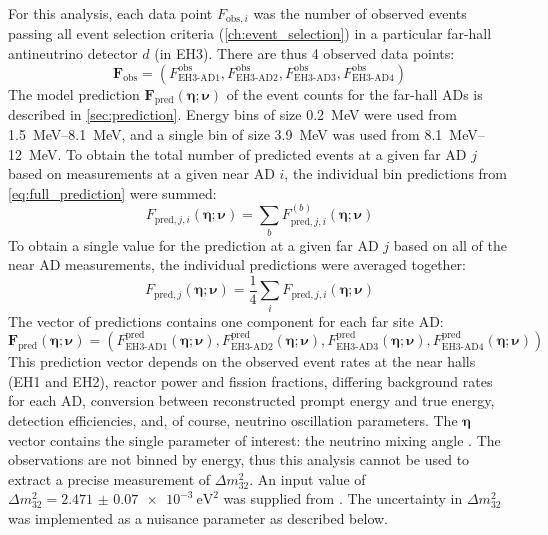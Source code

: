 For this analysis, each data point $F_{\text{obs},i}$
was the number of observed events passing all event selection criteria
(\cref{ch:event_selection})
in a particular far-hall antineutrino detector $d$ (in EH3).
There are thus 4 observed data points:
\begin{equation}
    \mathbf{F}_{\text{obs}} =
    (F^{\text{obs}}_{\text{EH3-AD1}},
    F^{\text{obs}}_{\text{EH3-AD2}},
    F^{\text{obs}}_{\text{EH3-AD3}},
    F^{\text{obs}}_{\text{EH3-AD4}})
\end{equation}
The model prediction
$\mathbf{F}_{\text{pred}}(\boldsymbol{\eta};\boldsymbol{\nu})$
of the event counts for the far-hall ADs
is described in \cref{sec:prediction}.
Energy bins of size \SI{0.2}{\MeV} were used from \SIrange{1.5}{8.1}{\MeV},
and a single bin of size \SI{3.9}{\MeV} was used from \SIrange{8.1}{12}{\MeV}.
To obtain the total number of predicted events at a given far AD $j$
based on measurements at a given near AD $i$,
the individual bin predictions from \cref{eq:full_prediction} were summed:
\begin{equation}\label{eq:hybrid_rate_shape}
    F_{\text{pred},j,i}(\boldsymbol{\eta};\boldsymbol{\nu}) =
    \sum_b F_{\text{pred},j,i}^{(b)}(\boldsymbol{\eta};\boldsymbol{\nu})
\end{equation}
To obtain a single value for the prediction at a given far AD $j$
based on all of the near AD measurements,
the individual predictions were averaged together:
\begin{equation}\label{eq:average_near}
    F_{\text{pred},j}(\boldsymbol{\eta};\boldsymbol{\nu}) =
    \frac{1}{4} \sum_i
    F_{\text{pred},j,i}(\boldsymbol{\eta};\boldsymbol{\nu})
\end{equation}
The vector of predictions contains one component for each far site AD:
\begin{equation}\label{eq:f_pred_vector}
    \mathbf{F}_\text{pred}(\boldsymbol{\eta};\boldsymbol{\nu}) =
    (
    F^{\text{pred}}_{\text{EH3-AD1}}(\boldsymbol{\eta};\boldsymbol{\nu}),
    F^{\text{pred}}_{\text{EH3-AD2}}(\boldsymbol{\eta};\boldsymbol{\nu}),
    F^{\text{pred}}_{\text{EH3-AD3}}(\boldsymbol{\eta};\boldsymbol{\nu}),
    F^{\text{pred}}_{\text{EH3-AD4}}(\boldsymbol{\eta};\boldsymbol{\nu})
    )
\end{equation}
This prediction vector depends on the observed event rates at the near halls (EH1 and EH2),
reactor power and fission fractions,
differing background rates for each AD,
conversion between reconstructed prompt energy and true \nuebar{} energy,
detection efficiencies,
and, of course, neutrino oscillation parameters.
The $\boldsymbol{\eta}$ vector contains the single parameter of interest:
the neutrino mixing angle \thetaot{}.
The observations are not binned by energy,
thus this analysis cannot be used to extract
a precise measurement of $\Delta m^2_{32}${}.
An input value of $\Delta m^2_{32} = \SI{2.471(70)e-3}{\eV\squared}$
was supplied from \cite{ngd2018}.
The uncertainty in $\Delta m^2_{32}${} was implemented
as a nuisance parameter as described below.

